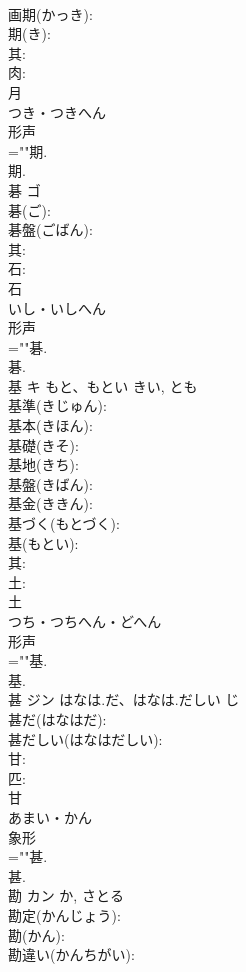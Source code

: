 \documentclass[8pt]{extreport}
\begin{document}
\begin{CJK}{UTF8}{min}
\\	画期(かっき): 
\\	期(き): 
\\	其: 
\\	肉: 
\\	月	
\\	つき・つきへん	
\\	形声 
\\	=""期.
\\	期.
\\	碁	ゴ			
\\	碁(ご): 
\\	碁盤(ごばん): 
\\	其: 
\\	石: 
\\	石	
\\	いし・いしへん	
\\	形声 
\\	=""碁.
\\	碁.
\\	基	キ	もと、もとい	きい, とも	
\\	基準(きじゅん): 
\\	基本(きほん): 
\\	基礎(きそ): 
\\	基地(きち): 
\\	基盤(きばん): 
\\	基金(ききん): 
\\	基づく(もとづく): 
\\	基(もとい): 
\\	其: 
\\	土: 
\\	土	
\\	つち・つちへん・どへん	
\\	形声 
\\	=""基.
\\	基.
\\	甚	ジン	はなは.だ、はなは.だしい	じ	
\\	甚だ(はなはだ): 
\\	甚だしい(はなはだしい): 
\\	甘: 
\\	匹: 
\\	甘	
\\	あまい・かん	
\\	象形 
\\	=""甚.
\\	甚.
\\	勘	カン		か, さとる	
\\	勘定(かんじょう): 
\\	勘(かん): 
\\	勘違い(かんちがい): 

\end{CJK}
\end{document}

